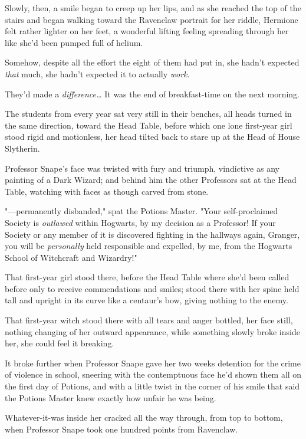 Slowly, then, a smile began to creep up her lips, and as she reached the top of
the stairs and began walking toward the Ravenclaw portrait for her riddle,
Hermione felt rather lighter on her feet, a wonderful lifting feeling spreading
through her like she'd been pumped full of helium.

Somehow, despite all the effort the eight of them had put in, she hadn't
expected \emph{that} much, she hadn't expected it to actually \emph{work}.

They'd made a \emph{difference{\ldots}}
\later
It was the end of breakfast-time on the next morning.

The students from every year sat very still in their benches, all heads turned
in the same direction, toward the Head Table, before which one lone first-year
girl stood rigid and motionless, her head tilted back to stare up at the Head
of House Slytherin.

Professor Snape's face was twisted with fury and triumph, vindictive as any
painting of a Dark Wizard; and behind him the other Professors sat at the Head
Table, watching with faces as though carved from stone.

"---permanently disbanded," spat the Potions Master. "Your self-proclaimed
Society is \emph{outlawed} within Hogwarts, by my decision as a Professor! If
your Society or any member of it is discovered fighting in the hallways again,
Granger, you will be \emph{personally} held responsible and expelled, by me,
from the Hogwarts School of Witchcraft and Wizardry!"

That first-year girl stood there, before the Head Table where she'd been called
before only to receive commendations and smiles; stood there with her spine
held tall and upright in its curve like a centaur's bow, giving nothing to the
enemy.

That first-year witch stood there with all tears and anger bottled, her face
still, nothing changing of her outward appearance, while something slowly broke
inside her, she could feel it breaking.

It broke further when Professor Snape gave her two weeks detention for the
crime of violence in school, sneering with the contemptuous face he'd shown
them all on the first day of Potions, and with a little twist in the corner of
his smile that said the Potions Master knew exactly how unfair he was being.

Whatever-it-was inside her cracked all the way through, from top to bottom,
when Professor Snape took one hundred points from Ravenclaw.

